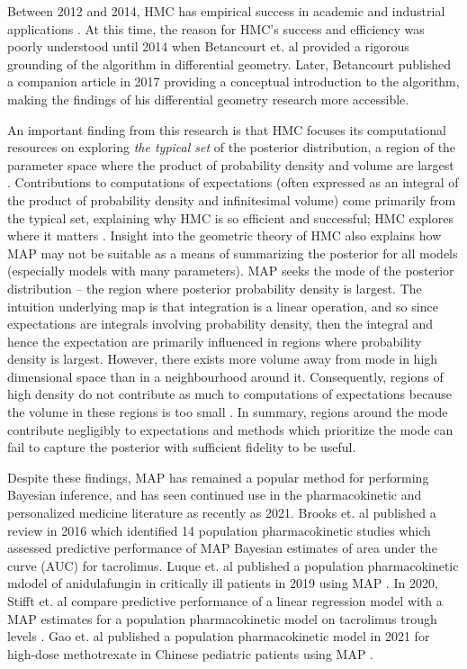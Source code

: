 Between 2012 and 2014, HMC has empirical success in academic and industrial applications  \cite{betancourt2014geometric, Carpenter2017-qf}.  At this time, the reason for HMC's success and efficiency was poorly understood until 2014 when  Betancourt et. al \cite{betancourt2014geometric} provided a rigorous grounding of the algorithm in differential geometry.  Later, Betancourt published a companion article in 2017 \cite{Betancourt2017-ak} providing a conceptual introduction to the algorithm, making the findings of his differential geometry research more accessible.

An important finding from this research is that HMC focuses its computational resources on exploring \textit{the typical set} of the posterior distribution, a region of the parameter space where the product of probability density and volume are largest \cite{Betancourt2017-ak}.  Contributions to computations of expectations  (often expressed as an integral of the product of probability density and infinitesimal volume) come primarily from the typical set, explaining why HMC is so efficient and successful; HMC explores where it matters \cite{Betancourt2017-ak}.  Insight into the geometric theory of HMC also explains how MAP may not be suitable as a means of summarizing the posterior for all models (especially models with many parameters).  MAP seeks the mode of the posterior distribution -- the region where posterior probability density is largest.  The intuition underlying map is that integration is a linear operation, and so since expectations are integrals involving probability density, then the integral and hence the expectation are primarily influenced in regions where probability density is largest.  However, there exists more volume away from mode in high dimensional space than in a  neighbourhood around it.  Consequently, regions of high density do not contribute as much to computations of expectations because the volume in these regions is too small \cite{Betancourt2017-ak}.  In summary, regions around the mode contribute negligibly to expectations and methods which prioritize the mode can fail to capture the posterior with sufficient fidelity to be useful.

Despite these findings, MAP has remained a popular method for performing Bayesian inference, and has seen continued use in the pharmacokinetic and personalized medicine literature as recently as 2021. Brooks et. al \cite{Brooks2016-li} published a review in 2016 which identified 14 population pharmacokinetic studies which assessed predictive performance of MAP Bayesian estimates of area under the curve (AUC) for tacrolimus. Luque et. al published a population pharmacokinetic mdodel of anidulafungin in critically ill patients in 2019 using MAP \cite{luque2019population}.  In 2020, Stifft et. al compare predictive performance of a linear regression model with a MAP estimates for a population pharmacokinetic model on tacrolimus trough levels \cite{Stifft2020-uq}.  Gao et. al published a population pharmacokinetic model in 2021 for high-dose methotrexate in Chinese pediatric patients using MAP \cite{gao2021population}. 

